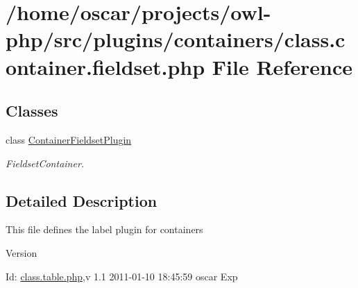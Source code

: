 \section{/home/oscar/projects/owl-\/php/src/plugins/containers/class.container.fieldset.php File Reference}
\label{class_8container_8fieldset_8php}
\subsection*{Classes}
\begin{DoxyCompactItemize}
\item 
class \hyperlink{classContainerFieldsetPlugin}{ContainerFieldsetPlugin}
\begin{DoxyCompactList}\small\item\em FieldsetContainer. \item\end{DoxyCompactList}\end{DoxyCompactItemize}


\subsection{Detailed Description}
This file defines the label plugin for containers \begin{DoxyVersion}{Version}

\end{DoxyVersion}
\begin{DoxyParagraph}{Id:}
\hyperlink{class_8table_8php}{class.table.php},v 1.1 2011-\/01-\/10 18:45:59 oscar Exp 
\end{DoxyParagraph}
